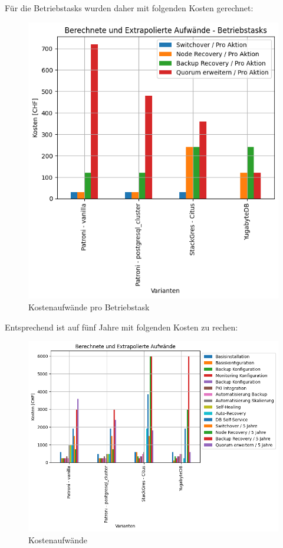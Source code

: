 \begin{flushleft}
    Für die Betriebstasks wurden daher mit folgenden Kosten gerechnet:
    \begin{figure}[H]
        \centering
        \includegraphics[width=0.75\linewidth]{source/pandas_data_chart_plotter/cost_investment_action}
        \caption{Kostenaufwände pro Betriebstask}
        \label{fig:cost_investment_action}
    \end{figure}
\end{flushleft}
\begin{flushleft}
    Entsprechend ist auf fünf Jahre mit folgenden Kosten zu rechen:
    \begin{figure}[H]
        \centering
        \includegraphics[width=0.75\linewidth]{source/pandas_data_chart_plotter/cost_investment}
        \caption{Kostenaufwände}
        \label{fig:cost_investment}
    \end{figure}
\end{flushleft}
